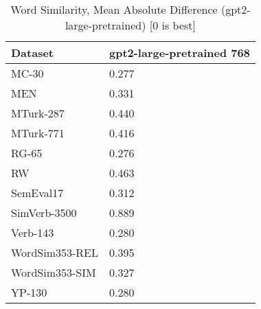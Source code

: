 \begin{table}[]
\centering
\begin{tabular}{l|l}
\hline
Dataset & gpt2-large-pretrained 768 \\
\hline
MC-30 & 0.277 \\ 
MEN & 0.331 \\ 
MTurk-287 & 0.440 \\ 
MTurk-771 & 0.416 \\ 
RG-65 & 0.276 \\ 
RW & 0.463 \\ 
SemEval17 & 0.312 \\ 
SimVerb-3500 & 0.889 \\ 
Verb-143 & 0.280 \\ 
WordSim353-REL & 0.395 \\ 
WordSim353-SIM & 0.327 \\ 
YP-130 & 0.280
\end{tabular}
\caption{Word Similarity, Mean Absolute Difference (gpt2-large-pretrained) [0 is best]}
\label{tab:similarity-gpt2-large-pretrained}
\end{table}
